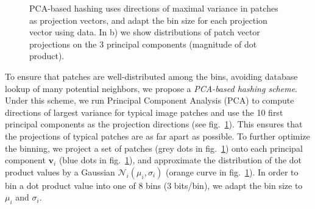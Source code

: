 \begin{figure}[ht!]
\centering
{}
\qquad
{}
\caption{PCA-based hashing uses directions of maximal
variance in patches as projection vectors, and
adapt the bin size for each projection vector using data.
In b) we show distributions of patch vector projections
on the 3 principal components (magnitude of dot product).}
\label{fig:pca}
\end{figure}

To ensure that patches are well-distributed
among the bins, avoiding database lookup of many potential
neighbors, we propose a \emph{PCA-based hashing scheme}.
Under this scheme, we run Principal Component Analysis (PCA)
to compute directions of largest variance for typical image patches
and use the 10 first principal components as the projection
directions (see fig.~\ref{fig:pca}). This ensures that
the projections of typical patches are as far apart as possible.
To further optimize the binning, we project
a set of patches (grey dots in fig.~\ref{fig:pca}) onto each
principal component $\mathbf{v}_i$ (blue dots in fig.~\ref{fig:pca}), and
approximate the distribution of the dot product
values by a Gaussian $\mathcal{N}_i(\mu_i, \sigma_i)$
(orange curve in fig.~\ref{fig:pca}).
In order to bin a dot product value into one of 8 bins (3 bits/bin),
we adapt the bin size to $\mu_i$ and $\sigma_i$.

